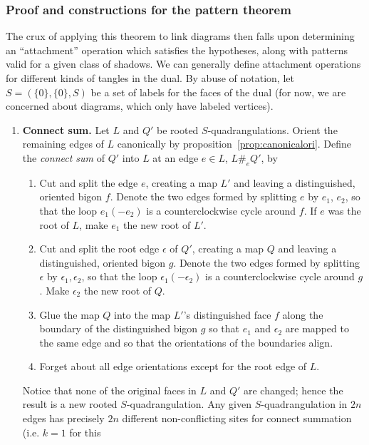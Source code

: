 \documentclass[amsmath,longbibliography,secnumarabic,floatfix,amssymb,nofootinbib,nobibnotes,letterpaper,11pt,tightenlines,notitlepage,showkeys,showlabels]{amsart}%
\theoremstyle{definition}
\begin{document}
\subsubsection{Proof and constructions for the pattern theorem}
\label{sec:proof-patt}

The crux of applying this theorem to link diagrams then falls upon
determining an ``attachment'' operation which satisfies the
hypotheses, along with patterns valid for a given class of shadows.
We can generally define attachment operations for different kinds of
tangles in the dual. By abuse of notation, let $S = (\{0\}, \{0\}, S)$ be a set of
labels for the faces of the dual (for now, we are concerned about
diagrams, which only have labeled vertices).
\begin{enumerate}
\item \textbf{Connect sum.} Let $L$ and $Q'$ be rooted $S$-quadrangulations. Orient the
  remaining edges of $L$ canonically by proposition~\ref{prop:canonicalori}. Define the
  \emph{connect sum} of $Q'$ into $L$ at an edge $e \in L$, $L \#_e Q'$, by
  \begin{enumerate}
  \item Cut and split the edge $e$, creating a map $L'$ and leaving a distinguished, oriented bigon
    $f$. Denote the two edges formed by splitting $e$ by $e_1$, $e_2$, so that the loop $e_1(-e_2)$
    is a counterclockwise cycle around $f$. If $e$ was the root of $L$, make $e_1$ the new root of
    $L'$.
  \item Cut and split the root edge $\epsilon$ of $Q'$, creating a map $Q$ and leaving a
    distinguished, oriented bigon $g$. Denote the two edges formed by splitting $\epsilon$ by
    $\epsilon_1, \epsilon_2$, so that the loop $\epsilon_1(-\epsilon_2)$ is a counterclockwise cycle
    around $g$. Make $\epsilon_2$ the new root of $Q$.
  \item Glue the map $Q$ into the map $L'$'s distinguished face $f$ along the boundary of the
    distinguished bigon $g$ so that $e_1$ and $\epsilon_2$ are mapped to the same edge and so that
    the orientations of the boundaries align.
  \item Forget about all edge orientations except for the root edge of $L$.
  \end{enumerate} Notice that none of the original faces in $L$ and $Q'$ are changed; hence the
  result is a new rooted $S$-quadrangulation. Any given $S$-quadrangulation in $2n$ edges
  has precisely $2n$ different non-conflicting sites for connect summation (i.e. $k = 1$ for this

\end{enumerate}
\end{document}
